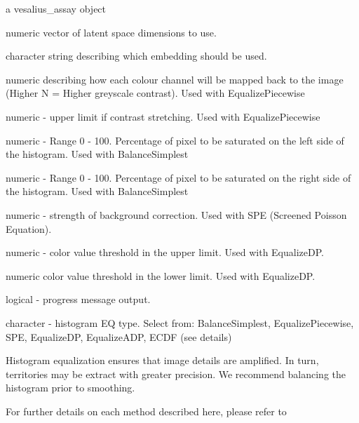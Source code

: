 \documentclass[a4paper]{book}
\begin{document}
%
\begin{Arguments}
\begin{ldescription}
\item[\code{vesalius\_assay}] a vesalius\_assay object

\item[\code{dimensions}] numeric vector of latent space dimensions to use.

\item[\code{embedding}] character string describing which embedding should
be used.

\item[\code{N}] numeric describing how each colour channel will be mapped back to
the image (Higher N = Higher greyscale contrast).
Used with EqualizePiecewise

\item[\code{smax}] numeric - upper limit if contrast stretching.
Used with EqualizePiecewise

\item[\code{sleft}] numeric - Range 0 - 100. Percentage of pixel to be saturated on
the left side of the histogram. Used with BalanceSimplest

\item[\code{sright}] numeric - Range 0 - 100. Percentage of pixel to be saturated on
the right side of the histogram. Used with BalanceSimplest

\item[\code{lambda}] numeric - strength of background correction.
Used with SPE (Screened Poisson Equation).

\item[\code{up}] numeric - color value threshold in the upper limit.
Used with EqualizeDP.

\item[\code{down}] numeric color value threshold in the lower limit.
Used with EqualizeDP.

\item[\code{verbose}] logical - progress message output.

\item[\code{type}] character - histogram EQ type. Select from: BalanceSimplest,
EqualizePiecewise, SPE, EqualizeDP, EqualizeADP, ECDF (see details)
\end{ldescription}
\end{Arguments}
%
\begin{Details}
Histogram equalization ensures that image details are amplified.
In turn, territories may be extract with greater precision. We recommend
balancing the histogram prior to smoothing.

For further details on each method described here, please refer to
\end{Details}
\end{document}
